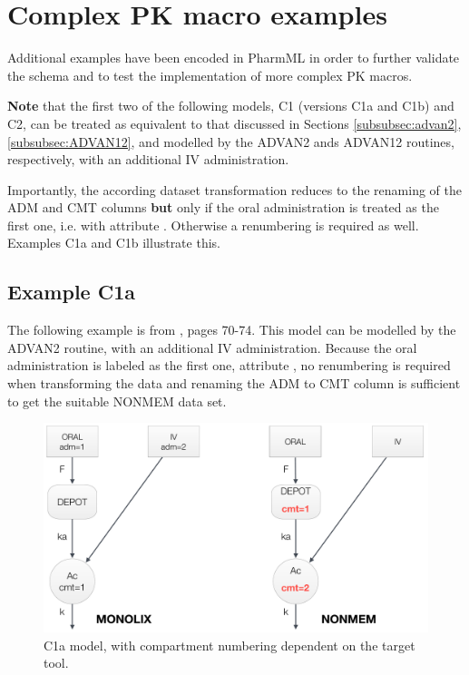 \section{Complex PK macro examples}
Additional examples have been encoded in PharmML in order to further validate the schema
and to test the implementation of more complex PK macros.

\textbf{Note} that the first two of the following models, C1 (versions C1a and C1b) and C2, 
can be treated as equivalent to that discussed in Sections \ref{subsubsec:advan2}, 
\ref{subsubsec:ADVAN12}, and modelled by the ADVAN2 ands ADVAN12 routines, 
respectively, with an additional IV administration.

Importantly, \marginpar{\HandCuffLeft} the according dataset transformation reduces 
to the renaming of the ADM and CMT columns \textbf{but} only if the oral administration 
is treated as the first one, i.e. with attribute . Otherwise a renumbering 
is required as well. Examples C1a and C1b illustrate this.

\subsection{Example C1a}
The following example is from \cite{Monolix4.3Tutorial:2014}, pages 70-74. This model
can be modelled by the ADVAN2 routine, with an additional IV administration. Because the 
oral administration is labeled as the first one, attribute , no renumbering is required 
when transforming the data and renaming the ADM to CMT column is sufficient to get the suitable 
NONMEM data set.

\begin{figure}[htbp!]
\centering
 \includegraphics[width=120mm]{pics/ComplexModel1}
\caption{C1a model, with compartment numbering dependent on the target tool.}
\label{fig:ComplexModel1a}
\end{figure}

